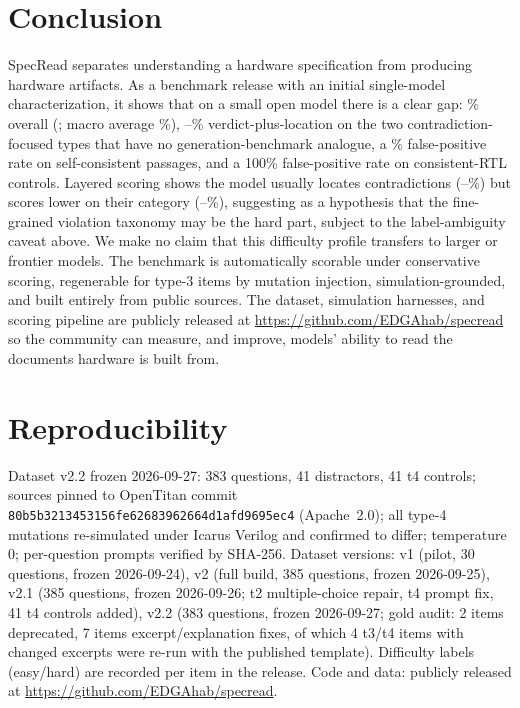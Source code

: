 \documentclass[11pt]{article}
\begin{document}
\section{Conclusion}
SpecRead separates understanding a hardware specification from producing hardware artifacts. As a benchmark release with an initial single-model characterization, it shows that on a small open model there is a clear gap: \ConsAccoverall\% overall (\ConsToverall; macro average \ConsMacroAvg\%), \ConsAccVLTthree--\ConsAccVLTfour\% verdict-plus-location on the two contradiction-focused types that have no generation-benchmark analogue, a \DistrAccFPR\% false-positive rate on self-consistent passages, and a 100\% false-positive rate on consistent-RTL controls. Layered scoring shows the model usually locates contradictions (\LayAccTthreeLoc--\LayAccTfourLoc\%) but scores lower on their category (\LayAccTfourCat--\LayAccTthreeCat\%), suggesting as a hypothesis that the fine-grained violation taxonomy may be the hard part, subject to the label-ambiguity caveat above. We make no claim that this difficulty profile transfers to larger or frontier models. The benchmark is automatically scorable under conservative scoring, regenerable for type-3 items by mutation injection, simulation-grounded, and built entirely from public sources. The dataset, simulation harnesses, and scoring pipeline are publicly released at \url{https://github.com/EDGAhab/specread} so the community can measure, and improve, models' ability to read the documents hardware is built from.

\section*{Reproducibility}
Dataset v2.2 frozen 2026-09-27: 383 questions, 41 distractors, 41 t4 controls; sources pinned to OpenTitan commit \texttt{80b5b3213453156fe62683962664d1afd9695ec4} (Apache~2.0); all type-4 mutations re-simulated under Icarus Verilog and confirmed to differ; temperature 0; per-question prompts verified by SHA-256. Dataset versions: v1 (pilot, 30 questions, frozen 2026-09-24), v2 (full build, 385 questions, frozen 2026-09-25), v2.1 (385 questions, frozen 2026-09-26; t2 multiple-choice repair, t4 prompt fix, 41 t4 controls added), v2.2 (383 questions, frozen 2026-09-27; gold audit: 2 items deprecated, 7 items excerpt/explanation fixes, of which 4 t3/t4 items with changed excerpts were re-run with the published template). Difficulty labels (easy/hard) are recorded per item in the release. Code and data: publicly released at \url{https://github.com/EDGAhab/specread}.
\end{document}
